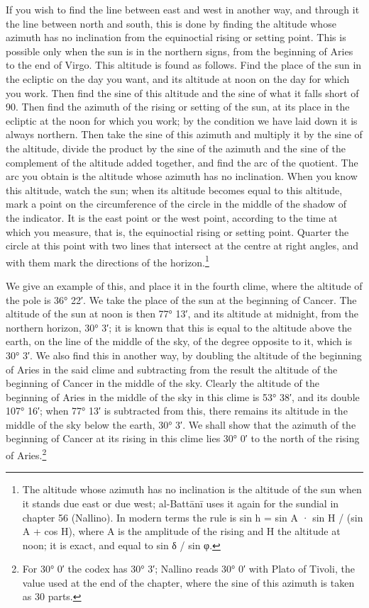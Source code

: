 \documentclass[11pt]{article}
\newcommand{\ArPage}[1]{\marginpar{\footnotesize\color{gray}Ar.\,p.\,#1}}
\begin{document}
\par \ArPage{37}If you wish to find the line between east and west in another way, and through it the line between north and south, this is done by finding the altitude whose azimuth has no inclination from the equinoctial rising or setting point. This is possible only when the sun is in the northern signs, from the beginning of Aries to the end of Virgo. This altitude is found as follows. Find the place of the sun in the ecliptic on the day you want, and its altitude at noon on the day for which you work. Then find the sine of this altitude and the sine of what it falls short of 90. Then find the azimuth of the rising or setting of the sun, at its place in the ecliptic at the noon for which you work; by the condition we have laid down it is always northern. Then take the sine of this azimuth and multiply it by the sine of the altitude, divide the product by the sine of the azimuth and the sine of the complement of the altitude added together, and find the arc of the quotient. The arc you obtain is the altitude whose azimuth has no inclination. When you know this altitude, watch the sun; when its altitude becomes equal to this altitude, mark a point on the circumference of the circle in the middle of the shadow of the indicator. It is the east point or the west point, according to the time at which you measure, that is, the equinoctial rising or setting point. Quarter the circle at this point with two lines that intersect at the centre at right angles, and with them mark the directions of the horizon.\footnote{The altitude whose azimuth has no inclination is the altitude of the sun when it stands due east or due west; al-Battānī uses it again for the sundial in chapter 56 (Nallino). In modern terms the rule is sin h = sin A · sin H / (sin A + cos H), where A is the amplitude of the rising and H the altitude at noon; it is exact, and equal to sin δ / sin φ.}\par
\par We give an example of this, and place it in the fourth clime, where the altitude of the pole is 36° 22′. We take the place of the sun at the beginning of Cancer. The altitude of the sun at noon is then 77° 13′, and its altitude at midnight, from the northern horizon, 30° 3′; it is known that this is equal to the altitude above the earth, on the line of the middle of the sky, of the degree opposite to it, which is 30° 3′. We also find this in another way, by doubling the altitude of the beginning of Aries in the said clime and subtracting from the result the altitude of the beginning of Cancer in the middle of the sky. Clearly the altitude of the beginning of Aries in the middle of the sky in this clime is 53° 38′, and its double 107° 16′; when 77° 13′ is subtracted from this, there remains its altitude in the middle of the sky below the earth, 30° 3′. We shall show that the azimuth of the beginning of Cancer at its rising in this clime lies 30° 0′ to the north of the rising of Aries.\footnote{For 30° 0′ the codex has 30° 3′; Nallino reads 30° 0′ with Plato of Tivoli, the value used at the end of the chapter, where the sine of this azimuth is taken as 30 parts.}\par
\end{document}
